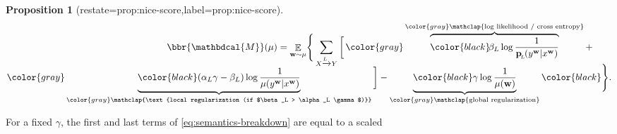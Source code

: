\documentclass[letterpaper]{article} %
\theoremstyle{plain}
\newtheorem{prop}[theorem]{Proposition}
\theoremstyle{definition}
\theoremstyle{remark}
\newcommand{\valpha}[1]{#1}
\DeclareMathOperator*{\Ex}{\mathbb{E}} %
\newcommand\mat[1]{\mathbf{#1}}
\newcommand{\bp}[1][L]{\mat{p}_{\!_{#1}\!}}
\newcommand{\V}{\mathcal V}
\newcommand{\dg}[1]{\mathbdcal{#1}}
\newcommand\GFE{\mathit{G\mkern-4mu F\mkern-4.5mu E}}
\begin{document}
\begin{prop}[restate=prop:nice-score,label=prop:nice-score]
\begin{equation}
\begin{split}
\bbr{\dg M}(\mu) =  \Ex_{\mat w \sim \mu}\! \Bigg\{
 \sum_{ X \xrightarrow{\!\!L} Y  }
\bigg[\,
    \color{gray}\overbrace{\color{black}
      \!\beta_L \log \frac{1}{\bp(y^{\mat w} |x^{\mat w})}
	}^{\color{gray}\smash{\mathclap{\text{log likelihood / cross entropy}}}} + \qquad\\[-0.7em]
    \color{gray}\underbrace{\color{black} 
(\valpha{\alpha_L}\gamma - \beta_L ) \log \frac{1}{\mu(y^{\mat w} |x^{\mat w})} 
	}_{\color{gray}\smash{\mathclap{\text{local regularization (if $\beta_L > 
	\alpha_L
	\gamma$)}}}}\bigg] - \underbrace{\color{black}
\gamma \log \frac{1}{\mu(\mat w)}
	}_{\color{gray}\smash{\mathclap{\text{global
        regularization}}}}\color{black} \Bigg\} .
\end{split}
\end{equation}
\end{prop}
For a fixed $\gamma$, the first and last terms
of \eqref{eq:semantics-breakdown} are equal to a scaled
\end{document}
